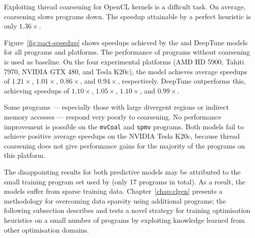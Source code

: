 Exploiting thread coarsening for OpenCL kernels is a difficult task. On average, coarsening slows programs down. The speedup attainable by a perfect heuristic is only $1.36\times$.

Figure~\ref{fig:pact-speedup} shows speedups achieved by the \citeauthor{Magni2014}and DeepTune models for all programs and platforms. The performance of programs without coarsening is used as baseline. On the four experimental platforms (AMD HD 5900, Tahiti 7970, NVIDIA GTX 480, and Tesla K20c), the \citeauthor{Magni2014}model achieves average speedups of $1.21\times$, $1.01\times$, $0.86\times$, and $0.94\times$, respectively. DeepTune outperforms this, achieving speedups of $1.10\times$, $1.05\times$, $1.10\times$, and $0.99\times$.

Some programs --- especially those with large divergent regions or indirect memory accesses --- respond very poorly to coarsening. No performance improvement is possible on the \texttt{mvCoal} and \texttt{spmv} programs. Both models fail to achieve positive average speedups on the NVIDIA Tesla K20c, because thread coarsening does not give performance gains for the majority of the programs on this platform.

The disappointing results for both predictive models may be attributed to the small training program set used by \citeauthor{Magni2014}(only 17 programs in total). As a result, the models suffer from sparse training data. Chapter~\ref{chap:clgen} presents a methodology for overcoming data sparsity using additional programs; the following subsection describes and tests a novel strategy for training optimisation heuristics on a small number of programs by exploiting knowledge learned from other optimisation domains.
